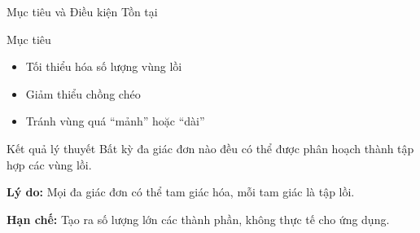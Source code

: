 \documentclass[aspectratio=169]{beamer}
\begin{document}
\begin{frame}{Mục tiêu và Điều kiện Tồn tại}

    \begin{alertblock}{Mục tiêu}
        \begin{itemize}
            \item Tối thiểu hóa số lượng vùng lồi
            \item Giảm thiểu chồng chéo
            \item Tránh vùng quá ``mảnh'' hoặc ``dài''
        \end{itemize}
    \end{alertblock}

    \begin{exampleblock}{Kết quả lý thuyết}
        Bất kỳ đa giác đơn nào đều có thể được phân hoạch thành tập hợp các vùng lồi.

        \textbf{Lý do:} Mọi đa giác đơn có thể tam giác hóa, mỗi tam giác là tập lồi.

        \textbf{Hạn chế:} Tạo ra số lượng lớn các thành phần, không thực tế cho ứng dụng.
    \end{exampleblock}

\end{frame}
\end{document}
